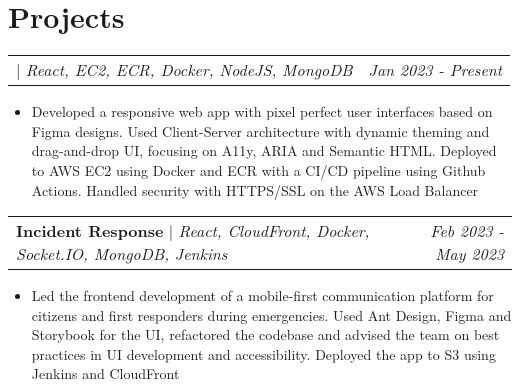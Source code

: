 \documentclass[letterpaper]{article}
\makeatletter
\newcommand{\resumeItemWithoutTitle}[1]{
  \item\small{
    {#1 \vspace{-2pt}}
  }
}
\newcommand{\resumeSubheadingWithoutTitle}[2]{
  \begin{tabular*}{\textwidth}{l@{\extracolsep{\fill}}r}
        \textbf{\textit{#1}} & \textit{\small #2} \\
    \end{tabular*}\vspace{-14pt}
}
\newcommand{\shortSection}[1]{
    \vspace{-6pt}
    \section{#1}
}
\newcommand{\projectHeading}[3]{
  \begin{tabular*}{\textwidth}{l@{\extracolsep{\fill}}r}
        \textbf{#1} 
        \hspace{-2pt} $\vert$ \hspace{-2pt} \small{\textit{#2}} 
        & 
        \textit{#3} \\
    \end{tabular*}\vspace{-2pt}
}
\newcommand{\projectHeadingWithLink}[4]{
  \begin{tabular*}{\textwidth}{l@{\extracolsep{\fill}}r}
        \textbf{\href{#4}{\color{blue}{#1}}}
        \hspace{-2pt} $\vert$ \hspace{-2pt} \small{\textit{#2}} 
        & 
        \textit{#3} \\
    \end{tabular*}\vspace{-2pt}
}
\newcommand{\resumeItemListStart}{\begin{itemize}}
\newcommand{\resumeItemListEnd}{\end{itemize}}
\makeatother
\begin{document}




\shortSection{Projects}
\vspace{3pt}
\projectHeadingWithLink {Kanban Task Manager}{React, EC2, ECR, Docker, NodeJS, MongoDB}{Jan 2023 - Present}{https://kanbhan.com}
\resumeItemListStart

\resumeItemWithoutTitle{Developed a responsive web app with pixel perfect user interfaces based on Figma designs. Used Client-Server architecture with dynamic theming and drag-and-drop UI, focusing on A11y, ARIA and Semantic HTML. Deployed to AWS EC2 using Docker and ECR with a CI/CD pipeline using Github Actions. Handled security with HTTPS/SSL on the AWS Load Balancer}
\resumeItemListEnd


\vspace{3pt}
\projectHeading {Incident Response}{React, CloudFront, Docker, Socket.IO, MongoDB, Jenkins}{Feb 2023 - May 2023}
\resumeItemListStart

\resumeItemWithoutTitle{Led the frontend development of a mobile-first communication platform for citizens and first responders during emergencies. Used Ant Design, Figma and Storybook for the UI, refactored the codebase and advised the team on best practices in UI development and accessibility. Deployed the app to S3 using Jenkins and CloudFront}
\resumeItemListEnd
\end{document}

